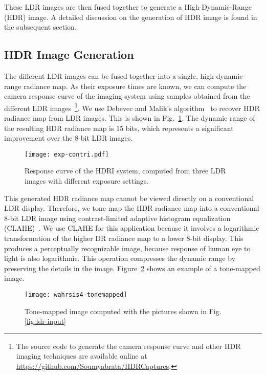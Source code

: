 These LDR images are then fused together to generate a High-Dynamic-Range (HDR) image. A detailed discussion on the generation of HDR image is found in the subsequent section. 

\subsection{HDR Image Generation}
\label{sec:HDR-discuss}

The different LDR images can be fused together into a single, high-dynamic-range radiance map. As their exposure times are known, we can compute the camera response curve of the imaging system using samples obtained from the different LDR images~\footnote{The source code to generate the camera response curve and other HDR imaging techniques are available online at \url{https://github.com/Soumyabrata/HDRCaptures}.}. We use Debevec and Malik's algorithm~\cite{DebevecHDR} to recover HDR radiance map from LDR images. This is shown in Fig.~\ref{fig:response-RGB}. The dynamic range of the resulting HDR radiance map is $15$ bits, which represents a significant improvement over the $8$-bit  LDR images. 

\begin{figure}[htb]
\begin{center}
\texttt{[image: exp-contri.pdf]}
\caption{Response curve of the HDRI system, computed from three LDR images with different exposure settings.
}
\label{fig:response-RGB}
\end{center}
\end{figure}


This generated HDR radiance map cannot be viewed directly on a conventional LDR display. Therefore, we tone-map the HDR radiance map into a conventional $8$-bit LDR image using contrast-limited adaptive histogram equalization (CLAHE)~\cite{CLAHE}. We use CLAHE for this application because it involves a logarithmic transformation of the higher DR radiance map to a lower $8$-bit display. This produces a perceptually recognizable image, because response of human eye to light is also logarithmic. This operation compresses the dynamic range by preserving the details in the image. Figure~\ref{fig:tonemapped} shows an example of a tone-mapped image.

\begin{figure}[htb]
\centering
\texttt{[image: wahrsis4-tonemapped]}
\caption{Tone-mapped image computed with the pictures shown in Fig. \ref{fig:ldr-input}}
\label{fig:tonemapped}
\end{figure}



